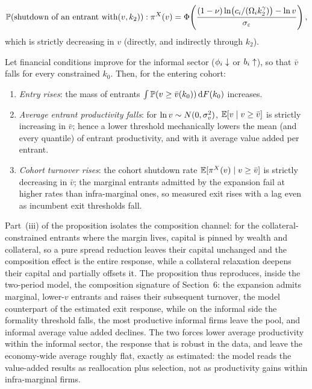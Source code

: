 \documentclass[12pt]{article}
\begin{document}
\begin{equation}
  \mathbb{P}(\text{shutdown of an entrant with} (v,k_{2})):
  \pi^{X}(v)=\Phi\!\left(
  \frac{(1-\nu)\ln\!\big(c_{i}/(\Omega_{i}k_{2}^{\gamma})\big)
        -\ln v}{\sigma_{\varepsilon}}\right),
  \label{eq:toy-shutdown}
\end{equation}
which is strictly decreasing in $v$ (directly, and indirectly through
$k_{2}$).
 
\begin{proposition}
\label{prop:composition}
Let financial conditions improve for the informal sector
($\phi_{i}\downarrow$ or $b_{i}\uparrow$), so that
$\bar v$ falls for every constrained $k_{0}$. Then, for the entering
cohort:
\begin{enumerate}
\item[(i)] \emph{Entry rises}: the mass of entrants
  $\int\mathbb{P}(v\geq\bar v(k_{0}))\,\mathrm{d} F(k_{0})$ increases.
\item[(ii)] \emph{Average entrant productivity falls}: for
  $\ln v\sim N(0,\sigma_{v}^{2})$,
  $\mathbb{E}[v\mid v\geq\bar v]$ is strictly increasing in $\bar v$; hence a
  lower threshold mechanically lowers the mean (and every quantile) of
  entrant productivity, and with it average value added per entrant.
\item[(iii)] \emph{Cohort turnover rises}: the cohort shutdown rate
  $\mathbb{E}[\pi^{X}(v)\mid v\geq\bar v]$ is strictly decreasing in
  $\bar v$; the marginal entrants admitted by the expansion fail at
  higher rates than infra-marginal ones, so measured exit rises with a
  lag even as incumbent exit thresholds fall.
\end{enumerate}
\end{proposition}

Part~(iii) of the proposition isolates the composition channel: for the collateral- constrained entrants where the margin lives, capital is pinned by wealth and collateral, so a pure spread reduction leaves their capital unchanged and the composition effect is the entire response, while a collateral relaxation deepens their capital and partially offsets it. The proposition thus reproduces, inside the two-period model, the composition signature of Section~6: the expansion admits marginal, lower-$v$ entrants and raises their subsequent turnover, the model counterpart of the estimated exit response, while on the informal side the formality threshold falls, the most productive informal firms leave the pool, and informal average value added declines. The two forces lower average productivity within the informal sector, the response that is robust in the data, and leave the economy-wide average roughly flat, exactly as estimated: the model reads the value-added results as reallocation plus selection, not as productivity gains within infra-marginal firms.
 
\end{document}
